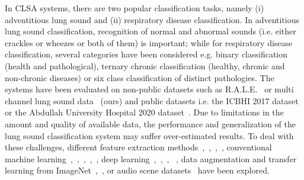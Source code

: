 \documentclass[journal]{IEEEtran}
\begin{document}
In CLSA systems, there are two popular classification tasks, namely (i) adventitious lung sound and (ii) respiratory disease classification. In adventitious lung sound classification, recognition of normal and abnormal sounds (i.e. either crackles or wheezes or both of them) is important; while for respiratory disease classification, several categories  have been considered e.g. binary classification (health and pathological), ternary chronic classification (healthy, chronic and non-chronic diseases) or six class classification of distinct pathologies. The systems have been evaluated on non-public
datasets such as R.A.L.E.~\cite{rale1990} or multi channel lung sound data~\cite{messner2016robust} (ours) and public datasets i.e. the ICBHI 2017 dataset~\cite{rocha2018alpha} or the Abdullah University Hospital 2020 dataset~\cite{fraiwan2021dataset}. Due to limitations in the amount and quality of available data, the performance and generalization of the lung sound classification system may suffer over-estimated results. To deal with these challenges, different feature extraction methods~\cite{chambres2018automatic},~\cite{jakovljevic2017hidden},~\cite{chen2019triple},~\cite{pham2021cnn}, conventional machine learning~\cite{jakovljevic2017hidden},~\cite{malmberg1996SOM},~\cite{bahoura2009patterngmm},~\cite{bokov2016wheezingSVM},~\cite{liu2017lung}, deep learning~\cite{messner2018crackle},~\cite{dPerna2019lstm},~\cite{aykanat2017cnn},
~\cite{nguyen2020lung}, data augmentation and transfer learning from ImageNet~\cite{demir2020convolutional},~\cite{acharya2020deep}, or audio scene datasets~\cite{shi2019lung} have been explored. 
\end{document}

